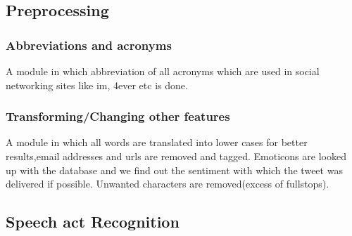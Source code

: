 \documentclass[conference]{IEEEtran}
\begin{document}
\subsection{\textbf{Preprocessing}}

\subsubsection{\textbf{Abbreviations and acronyms}}

\par A module in which abbreviation of all acronyms which are used in social networking sites like im, 4ever etc is done.

\subsubsection{\textbf{Transforming/Changing other features}}

\par A module in which all words are translated into lower cases for better results,email addresses and urls are removed and tagged. Emoticons are looked up with the database and we find out the sentiment with which the tweet was delivered if possible. Unwanted characters are removed(excess of fullstops).

\subsection{\textbf{Speech act Recognition}}
\end{document}
